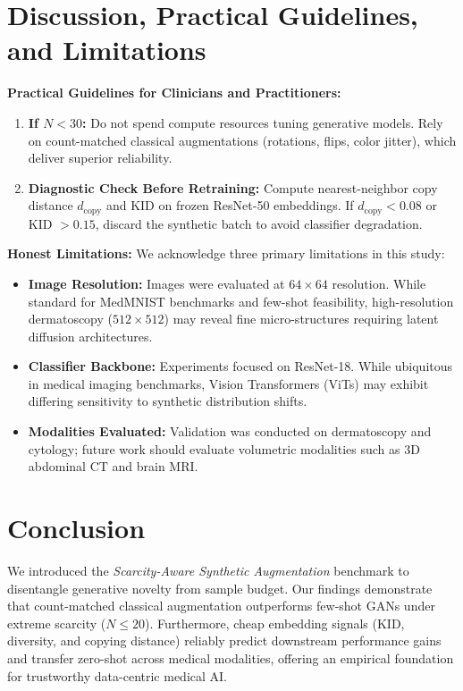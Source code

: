 \documentclass[runningheads]{llncs}
\begin{document}
\section{Discussion, Practical Guidelines, and Limitations}
\label{sec:discussion}
\noindent \textbf{Practical Guidelines for Clinicians and Practitioners:}
\begin{enumerate}
    \item \textbf{If $N < 30$:} Do not spend compute resources tuning generative models. Rely on count-matched classical augmentations (rotations, flips, color jitter), which deliver superior reliability.
    \item \textbf{Diagnostic Check Before Retraining:} Compute nearest-neighbor copy distance $d_{\text{copy}}$ and KID on frozen ResNet-50 embeddings. If $d_{\text{copy}} < 0.08$ or KID $> 0.15$, discard the synthetic batch to avoid classifier degradation.
\end{enumerate}

\noindent \textbf{Honest Limitations:} We acknowledge three primary limitations in this study:
\begin{itemize}
    \item \textbf{Image Resolution:} Images were evaluated at $64 \times 64$ resolution. While standard for MedMNIST benchmarks and few-shot feasibility, high-resolution dermatoscopy ($512 \times 512$) may reveal fine micro-structures requiring latent diffusion architectures.
    \item \textbf{Classifier Backbone:} Experiments focused on ResNet-18. While ubiquitous in medical imaging benchmarks, Vision Transformers (ViTs) may exhibit differing sensitivity to synthetic distribution shifts.
    \item \textbf{Modalities Evaluated:} Validation was conducted on dermatoscopy and cytology; future work should evaluate volumetric modalities such as 3D abdominal CT and brain MRI.
\end{itemize}

\section{Conclusion}
\label{sec:conclusion}
We introduced the \textit{Scarcity-Aware Synthetic Augmentation} benchmark to disentangle generative novelty from sample budget. Our findings demonstrate that count-matched classical augmentation outperforms few-shot GANs under extreme scarcity ($N \le 20$). Furthermore, cheap embedding signals (KID, diversity, and copying distance) reliably predict downstream performance gains and transfer zero-shot across medical modalities, offering an empirical foundation for trustworthy data-centric medical AI.



\end{document}
